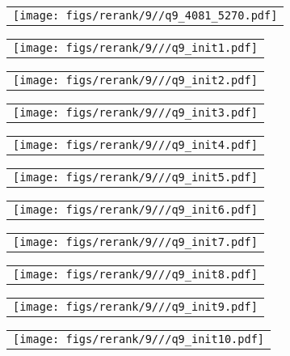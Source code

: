 \begin{figure*}[t]
\begin{tabular}{@{\sssp}c@{\sssp}}\texttt{[image: figs/rerank/9//q9\_4081\_5270.pdf]}\end{tabular} 
\begin{tabular}{@{\sssp}c@{\sssp}}\texttt{[image: figs/rerank/9///q9\_init1.pdf]}\end{tabular}
\begin{tabular}{@{\sssp}c@{\sssp}}\texttt{[image: figs/rerank/9///q9\_init2.pdf]}\end{tabular}
\begin{tabular}{@{\sssp}c@{\sssp}}\texttt{[image: figs/rerank/9///q9\_init3.pdf]}\end{tabular}
\begin{tabular}{@{\sssp}c@{\sssp}}\texttt{[image: figs/rerank/9///q9\_init4.pdf]}\end{tabular}
\begin{tabular}{@{\sssp}c@{\sssp}}\texttt{[image: figs/rerank/9///q9\_init5.pdf]}\end{tabular}
\begin{tabular}{@{\sssp}c@{\sssp}}\texttt{[image: figs/rerank/9///q9\_init6.pdf]}\end{tabular}
\begin{tabular}{@{\sssp}c@{\sssp}}\texttt{[image: figs/rerank/9///q9\_init7.pdf]}\end{tabular}
\begin{tabular}{@{\sssp}c@{\sssp}}\texttt{[image: figs/rerank/9///q9\_init8.pdf]}\end{tabular}
\begin{tabular}{@{\sssp}c@{\sssp}}\texttt{[image: figs/rerank/9///q9\_init9.pdf]}\end{tabular}
\begin{tabular}{@{\sssp}c@{\sssp}}\texttt{[image: figs/rerank/9///q9\_init10.pdf]}\end{tabular}


\end{figure*}
